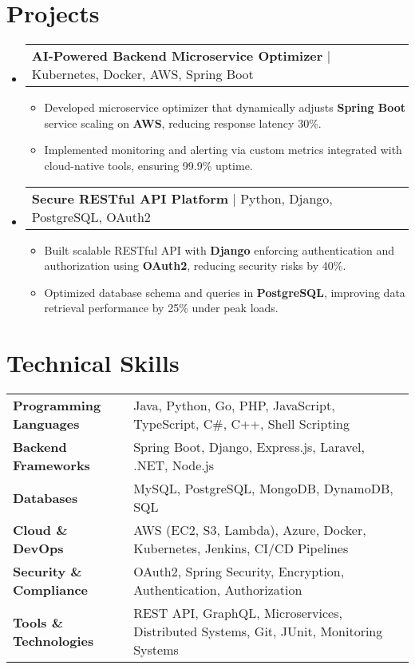 \documentclass[letterpaper,11pt]{article}
\makeatletter
\newcommand{\resumeItem}[1]{
  \item\footnotesize{
    {#1 \vspace{-2pt}}
  }
}
\newcommand{\resumeProjectHeading}[2]{
    \item
    \begin{tabular*}{1.001\textwidth}{l@{\extracolsep{\fill}}r}
      \small#1 & \textbf{\small #2}\\
    \end{tabular*}\vspace{-7pt}
}
\newcommand{\resumeSubHeadingListStart}{\begin{itemize}[leftmargin=0pt, label={}]}
\newcommand{\resumeSubHeadingListEnd}{\end{itemize}}
\newcommand{\resumeItemListStart}{\begin{itemize}[leftmargin=*]}
\newcommand{\resumeItemListEnd}{\end{itemize}\vspace{-5pt}}
\makeatother
\begin{document}
\section{Projects}
    \vspace{-5pt}
    \resumeSubHeadingListStart
      \resumeProjectHeading
          {\textbf{AI-Powered Backend Microservice Optimizer} | Kubernetes, Docker, AWS, Spring Boot}
          {}
          \resumeItemListStart
              \resumeItem{Developed microservice optimizer that dynamically adjusts \textbf{Spring Boot} service scaling on \textbf{AWS}, reducing response latency 30\%.}
              \resumeItem{Implemented monitoring and alerting via custom metrics integrated with cloud-native tools, ensuring 99.9\% uptime.}
          \resumeItemListEnd
          \vspace{-16pt}
      \resumeProjectHeading
          {\textbf{Secure RESTful API Platform} | Python, Django, PostgreSQL, OAuth2}
          {}
          \resumeItemListStart
              \resumeItem{Built scalable RESTful API with \textbf{Django} enforcing authentication and authorization using \textbf{OAuth2}, reducing security risks by 40\%.}
              \resumeItem{Optimized database schema and queries in \textbf{PostgreSQL}, improving data retrieval performance by 25\% under peak loads.}
          \resumeItemListEnd
    \resumeSubHeadingListEnd
\vspace{-10pt}
\section{Technical Skills}
        \vspace{-14pt}
        \begin{table}[h]
            \footnotesize
            \begin{tabular}{p{0.3\linewidth} p{0.7\linewidth}}
                \textbf{Programming Languages} & Java, Python, Go, PHP, JavaScript, TypeScript, C\#, C++, Shell Scripting \\
                \textbf{Backend Frameworks} & Spring Boot, Django, Express.js, Laravel, .NET, Node.js \\
                \textbf{Databases} & MySQL, PostgreSQL, MongoDB, DynamoDB, SQL \\
                \textbf{Cloud \& DevOps} & AWS (EC2, S3, Lambda), Azure, Docker, Kubernetes, Jenkins, CI/CD Pipelines \\
                \textbf{Security \& Compliance} & OAuth2, Spring Security, Encryption, Authentication, Authorization \\
                \textbf{Tools \& Technologies} & REST API, GraphQL, Microservices, Distributed Systems, Git, JUnit, Monitoring Systems \\
            \end{tabular}
        \end{table}
\end{document}
